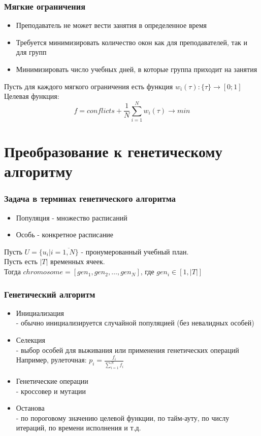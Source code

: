 \documentclass[t, 12pt]{beamer}
\theoremstyle{definition}
\begin{document}
\begin{frame}
\frametitle{Мягкие ограничения}
\begin{itemize}
\item Преподаватель не может вести занятия в определенное время\\
\item Требуется минимизировать количество окон как для преподавателей, так и для групп\\
\item Минимизировать число учебных дней, в которые группа приходит на занятия\\
\end{itemize}
Пусть для каждого мягкого ограничения есть функция $w_i(\tau): \{\tau\} \to [0;1]$\\
Целевая функция:
$$f = conflicts + \frac{1}{N} \sum^N_{i=1} w_i(\tau) \to min$$
\end{frame}

\section{Преобразование к генетическому алгоритму}

\begin{frame}[c]
\frametitle{Задача в терминах генетического алгоритма}
\begin{itemize}
\item Популяция - множество расписаний
\item Особь - конкретное расписание
\end{itemize}
Пусть $U = \{u_i | i = \overline{1, N}\}$ - пронумерованный учебный план.\\
Пусть есть $|T|$ временных ячеек.\\
Тогда $chromosome = [gen_1, gen_2, \dots, gen_N]$, где  $gen_i \in [1, |T|]$\\
\end{frame}

\begin{frame}
\frametitle{Генетический алгоритм}
\begin{itemize}
\item Инициализация\\
- обычно инициализируется случайной популяцией (без невалидных особей)
\item Селекция\\
- выбор особей для выживания или применения генетических операций\\
Например, рулеточная: $p_i = \frac{f_i}{\sum^N_{i=1}f_i}$
\item Генетические операции\\
- кроссовер и мутации
\item Останова\\
- по пороговому значению целевой функции, по тайм-ауту, по числу итераций, по времени исполнения и т.д.
\end{itemize}
\end{frame}
\end{document}
